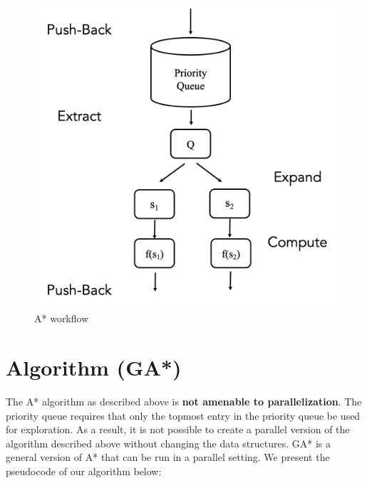\begin{figure}
    \centering
    \includegraphics[scale=0.5]{figures/astar.png}
    \caption{A* workflow}
    \label{fig:astar}
\end{figure}

\section{Algorithm (GA*)\cite{paper}}

The A* algorithm as described above is \textbf{not amenable to parallelization}. The priority queue requires that only the topmost entry in the priority queue be used for exploration. As a result, it is not possible to create a parallel version of the algorithm described above without changing the data structures.\newline\newline
GA* is a general version of A* that can be run in a parallel setting. We present the pseudocode of our algorithm below:

